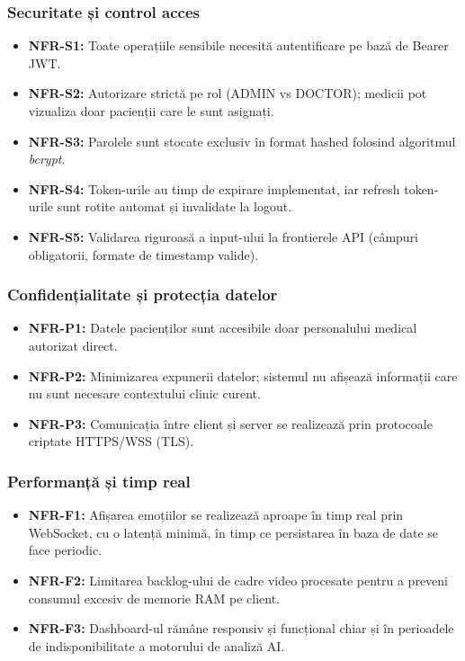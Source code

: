 \subsubsection{Securitate și control acces}
\begin{itemize}[noitemsep]
    \item \textbf{NFR-S1:} Toate operațiile sensibile necesită autentificare pe bază de Bearer JWT.
    \item \textbf{NFR-S2:} Autorizare strictă pe rol (ADMIN vs DOCTOR); medicii pot vizualiza doar pacienții care le sunt asignați.
    \item \textbf{NFR-S3:} Parolele sunt stocate exclusiv în format hashed folosind algoritmul \textit{bcrypt}.
    \item \textbf{NFR-S4:} Token-urile au timp de expirare implementat, iar refresh token-urile sunt rotite automat și invalidate la logout.
    \item \textbf{NFR-S5:} Validarea riguroasă a input-ului la frontierele API (câmpuri obligatorii, formate de timestamp valide).
\end{itemize}

\subsubsection{Confidențialitate și protecția datelor}
\begin{itemize}[noitemsep]
    \item \textbf{NFR-P1:} Datele pacienților sunt accesibile doar personalului medical autorizat direct.
    \item \textbf{NFR-P2:} Minimizarea expunerii datelor; sistemul nu afișează informații care nu sunt necesare contextului clinic curent.
    \item \textbf{NFR-P3:} Comunicația între client și server se realizează prin protocoale criptate HTTPS/WSS (TLS).
\end{itemize}

\subsubsection{Performanță și timp real}
\begin{itemize}[noitemsep]
    \item \textbf{NFR-F1:} Afișarea emoțiilor se realizează aproape în timp real prin WebSocket, cu o latență minimă, în timp ce persistarea în baza de date se face periodic.
    \item \textbf{NFR-F2:} Limitarea backlog-ului de cadre video procesate pentru a preveni consumul excesiv de memorie RAM pe client.
    \item \textbf{NFR-F3:} Dashboard-ul rămâne responsiv și funcțional chiar și în perioadele de indisponibilitate a motorului de analiză AI.
\end{itemize}

